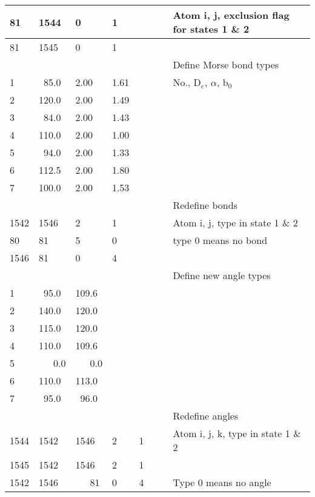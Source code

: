 \documentclass[a4paper,10pt]{article}
\begin{document}
\begin{longtable}{|p{35pt} p{35pt} p{35pt} p{35pt} p{35pt} p{35pt} p{35pt}| p{100pt}|}
  \hline 81 & 1544 & 0 & 1              &  &  &  & Atom i, j, exclusion flag for states 1 \& 2 \\
  \hline 81 & 1545 & 0 & 1              &  &  &  & \\
  \hline [bond{\_}types] &        &  &  &  &  &  & Define Morse bond types \\
  \hline 1 & ~85.0 & 2.00 & 1.61        &  &  &  & No., D$_e$, $\alpha$, b$_0$ \\
  \hline 2 & 120.0 & 2.00 & 1.49        &  &  &  & \\
  \hline 3 & ~84.0 & 2.00 & 1.43        &  &  &  & \\
  \hline 4 & 110.0 & 2.00 & 1.00        &  &  &  & \\
  \hline 5 & ~94.0 & 2.00 & 1.33        &  &  &  & \\
  \hline 6 & 112.5 & 2.00 & 1.80        &  &  &  & \\
  \hline 7 & 100.0 & 2.00 & 1.53        &  &  &  & \\
  \hline [change{\_}bonds] &      &  &  &  &  &  & Redefine bonds \\
  \hline 1542 & 1546 & 2 & 1            &  &  &  & Atom i, j, type in state 1 \& 2 \\
  \hline 80   &   81 & 5 & 0            &  &  &  & type 0 means no bond \\
  \hline 1546 &   81 & 0 & 4            &  &  &  & \\
  \hline [angle{\_}types] &       &  &  &  &  &  & Define new angle types \\
  \hline 1 & ~95.0 & 109.6           &  &  &  &  & \\
  \hline 2 & 140.0 & 120.0           &  &  &  &  & \\
  \hline 3 & 115.0 & 120.0           &  &  &  &  & \\
  \hline 4 & 110.0 & 109.6           &  &  &  &  & \\
  \hline 5 & ~~~0.0&~~~0.0           &  &  &  &  & \\
  \hline 6 & 110.0 & 113.0           &  &  &  &  & \\
  \hline 7 & ~95.0 & ~96.0           &  &  &  &  & \\
  \hline [change{\_}angles] &     &  &  &  &  &  & Redefine angles \\
  \hline 1544 & 1542 & 1546 & 2 & 1        &  &  & Atom i, j, k, type in state 1 \& 2 \\
  \hline 1545 & 1542 & 1546 & 2 & 1        &  &  & \\
  \hline 1542 & 1546 &~~~81 & 0 & 4        &  &  & Type 0 means no angle \\

\end{longtable}
\end{document}
